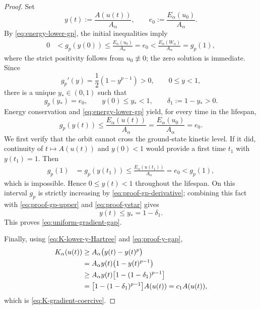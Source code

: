 \documentclass[preprint,12pt]{elsarticle}
\numberwithin{equation}{section}
\theoremstyle{remark}
\newcommand{\Ecal}{E_{\alpha}}
\newcommand{\Kcal}{K_{\alpha}}
\begin{document}
\begin{proof}
Set
\begin{equation*}
  y(t):=\frac{A(u(t))}{A_\alpha},
  \qquad
  e_0:=\frac{\Ecal(u_0)}{A_\alpha}.
\end{equation*}
By \eqref{eq:energy-lower-gp}, the initial inequalities imply
\begin{align*}
  0
  &< g_p(y(0))
  \le \frac{\Ecal(u_0)}{A_\alpha}
  =e_0
  <\frac{\Ecal(W_\alpha)}{A_\alpha}
  =g_p(1),
\end{align*}
where the strict positivity follows from $u_0\not\equiv0$; the zero solution is immediate.  Since
\begin{equation}\label{eq:proof-gp-derivative}
  g_p'(y)=\frac12(1-y^{p-1})>0,
  \qquad 0\le y<1,
\end{equation}
there is a unique $y_*\in(0,1)$ such that
\begin{equation}\label{eq:proof-ystar}
  g_p(y_*)=e_0,
  \qquad
  y(0)\le y_*<1,
  \qquad
  \delta_1:=1-y_*>0.
\end{equation}
Energy conservation and \eqref{eq:energy-lower-gp} yield, for every time in the lifespan,
\begin{equation}\label{eq:proof-gp-upper}
  g_p(y(t))
  \le \frac{\Ecal(u(t))}{A_\alpha}
  =\frac{\Ecal(u_0)}{A_\alpha}
  =e_0.
\end{equation}
We first verify that the orbit cannot cross the ground-state kinetic level.  If it did, continuity of $t\mapsto A(u(t))$ and $y(0)<1$ would provide a first time $t_1$ with $y(t_1)=1$.  Then
\begin{align*}
  g_p(1)
  &=g_p(y(t_1))
  \le \frac{\Ecal(u(t_1))}{A_\alpha}
  =e_0
  <g_p(1),
\end{align*}
which is impossible.  Hence $0\le y(t)<1$ throughout the lifespan.  On this interval $g_p$ is strictly increasing by \eqref{eq:proof-gp-derivative}; combining this fact with \eqref{eq:proof-gp-upper} and \eqref{eq:proof-ystar} gives
\begin{equation}\label{eq:proof-y-gap}
  y(t)\le y_*=1-\delta_1.
\end{equation}
This proves \eqref{eq:uniform-gradient-gap}.

Finally, using \eqref{eq:K-lower-y-Hartree} and \eqref{eq:proof-y-gap},
\begin{align*}
  \Kcal(u(t))
  &\ge A_\alpha\bigl(y(t)-y(t)^p\bigr)\notag\\
  &=A_\alpha y(t)\bigl(1-y(t)^{p-1}\bigr)\notag\\
  &\ge A_\alpha y(t)
  \bigl[1-(1-\delta_1)^{p-1}\bigr]\notag\\
  &=\bigl[1-(1-\delta_1)^{p-1}\bigr]A(u(t))
  =c_1A(u(t)),
\end{align*}
which is \eqref{eq:K-gradient-coercive}.
\end{proof}
\end{document}
